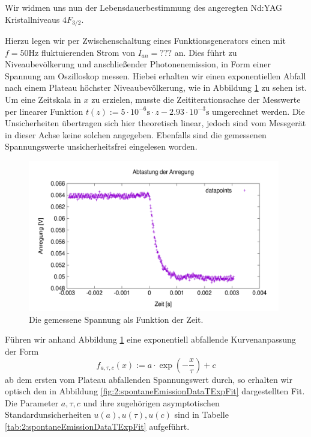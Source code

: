 \documentclass[../../main.tex]{subfiles}
\begin{document}
    Wir widmen uns nun der Lebensdauerbestimmung des angeregten Nd:YAG Kristallniveaus $4F_{3/2}$. 

    Hierzu legen wir per Zwischenschaltung eines Funktionsgenerators einen mit $f = 50\si{\hertz}$ fluktuierenden Strom von $I_{\textit{an}} = ???$ an. Dies führt zu Niveaubevölkerung und anschließender Photonenemission, in Form einer Spannung am Oszilloskop messen. Hiebei erhalten wir einen exponentiellen Abfall nach einem Plateau höchster Niveaubevölkerung, wie in Abbildung \ref{fig:2:spontaneEmissionDataT} zu sehen ist. Um eine Zeitskala in $x$ zu erzielen, musste die Zeititerationsachse der Messwerte per linearer Funktion $t(z) := 5\cdot 10^{-6}\si{\s}\cdot z - 2.93\cdot 10^{-3}\si{\s}$ umgerechnet werden. Die Unsicherheiten übertragen sich hier theoretisch linear, jedoch sind vom Messgerät in dieser Achse keine solchen angegeben. Ebenfalls sind die gemessenen Spannungswerte unsicherheitsfrei eingelesen worden. 
    \begin{figure}[H]
        \centering
        \includegraphics[width=11cm]{../../Bilddateien/2/spontane_emission_data_t.png}
        \caption{Die gemessene Spannung als Funktion der Zeit.}
        \label{fig:2:spontaneEmissionDataT}
    \end{figure}
    Führen wir anhand Abbildung \ref{fig:2:spontaneEmissionDataT} eine exponentiell abfallende Kurvenanpassung der Form 
    \[
        f_{a,\tau,c}(x) := a\cdot \exp(-\frac{x}{\tau}) + c
    \]
    ab dem ersten vom Plateau abfallenden Spannungswert durch, so erhalten wir optisch den in Abbildung \ref{fig:2:spontaneEmissionDataTExpFit} dargestellten Fit. Die Parameter $a,\tau,c$ und ihre zugehörigen asymptotischen Standardunsicherheiten $u(a),u(\tau),u(c)$ sind in Tabelle \ref{tab:2:spontaneEmissionDataTExpFit} aufgeführt.
\end{document}
